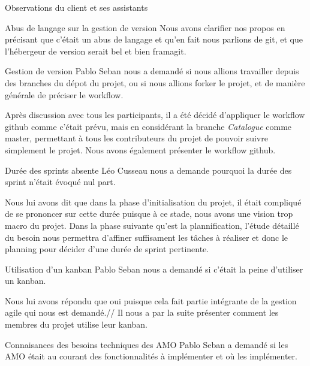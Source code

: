 \documentclass[]{article}
\begin{document}
\begin{section}{Observations du client et ses assistants}
\begin{subsection}{Abus de langage sur la gestion de version}
            Nous avons clarifier nos propos en précisant que c'était un abus de langage et qu'en fait nous parlions de git, et 
            que l'hébergeur de version serait bel et bien framagit.
        \end{subsection}

        \begin{subsection}{Gestion de version}
            Pablo Seban nous a demandé si nous allions travailler depuis des branches du dépot du projet, ou si nous allions
            forker le projet, et de manière générale de préciser le workflow.

            Après discussion avec tous les participants, il a été décidé d'appliquer le workflow github comme c'était prévu, 
            mais en considérant la branche \emph{Catalogue} comme master, permettant à tous les contributeurs du projet de 
            pouvoir suivre simplement le projet. Nous avons également présenter le workflow github.
        \end{subsection}

        \begin{subsection}{Durée des sprints absente}
            Léo Cusseau nous a demande pourquoi la durée des sprint n'était évoqué nul part.

            Nous lui avons dit que dans la phase d'initialisation du projet, il était compliqué de se prononcer sur cette durée 
            puisque à ce stade, nous avons une vision trop macro du projet. Dans la phase suivante qu'est la plannification, 
            l'étude détaillé du besoin nous permettra d'affiner suffisament les tâches à réaliser et donc le planning pour 
            décider d'une durée de sprint pertinente.
        \end{subsection}

        \begin{subsection}{Utilisation d'un kanban}
            Pablo Seban nous a demandé si c'était la peine d'utiliser un kanban.

            Nous lui avons répondu que oui puisque cela fait partie intégrante de la gestion agile qui nous est demandé.//
            Il nous a par la suite présenter comment les membres du projet utilise leur kanban.
        \end{subsection}

        \begin{subsection}{Connaisances des besoins techniques des AMO}
            Pablo Seban a demandé si les AMO était au courant des fonctionnalités à implémenter et où les implémenter.


\end{subsection}
\end{section}
\end{document}
